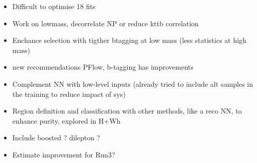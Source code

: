 \begin{itemize}
    \item Difficult to optimise 18 fits
    \item Work on lowmass, decorrelate NP or reduce kttb correlation
    \item Enchance selection with tigther btagging at low mass (less statistics at high mass)
    \item new recommendations PFlow, b-tagging has improvements
    \item Complement NN with low-level inputs (already tried to include alt samples in the training to reduce impact of sys)
    \item Region definition and classification with other methods, like a reco NN, to enhance purity, explored in H+Wh
    \item Include boosted ? dilepton ?
    \item Estimate improvement for Run3?
\end{itemize}




